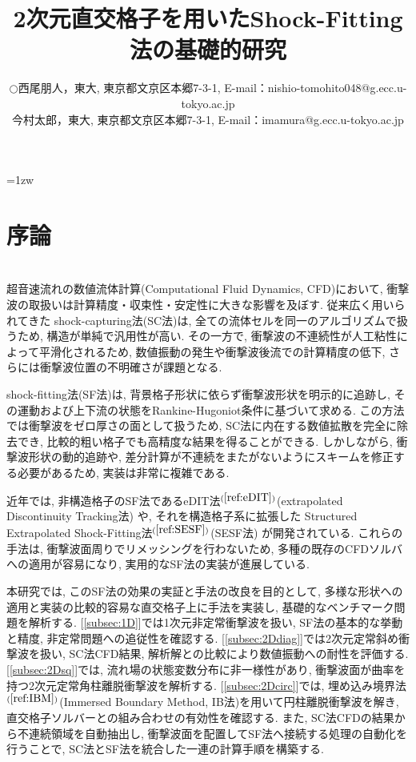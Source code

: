 \documentclass[a4j]{jarticle}
\title{2次元直交格子を用いたShock-Fitting法の基礎的研究}   %
\author{\begin{tabular}{cl}
$\bigcirc$ & 西尾朋人，東大, 
             東京都文京区本郷7-3-1, 
             E-mail：nishio-tomohito048@g.ecc.u-tokyo.ac.jp \\
           & 今村太郎，東大,
             東京都文京区本郷7-3-1, 
             E-mail：imamura@g.ecc.u-tokyo.ac.jp
\end{tabular} }
\begin{document}
\baselineskip=1zw
\maketitle

\section{序論} \label{sec:intro}
\mbox{}\\[-3.0ex]

超音速流れの数値流体計算(Computational Fluid Dynamics, CFD)において, 衝撃波の取扱いは計算精度・収束性・安定性に大きな影響を及ぼす.
従来広く用いられてきた shock-capturing法(SC法)は, 全ての流体セルを同一のアルゴリズムで扱うため, 構造が単純で汎用性が高い. 
その一方で, 衝撃波の不連続性が人工粘性によって平滑化されるため, 
数値振動の発生や衝撃波後流での計算精度の低下, さらには衝撃波位置の不明確さが課題となる.

shock-fitting法(SF法)は, 背景格子形状に依らず衝撃波形状を明示的に追跡し, 
その運動および上下流の状態をRankine-Hugoniot条件に基づいて求める.
この方法では衝撃波をゼロ厚さの面として扱うため, SC法に内在する数値拡散を完全に除去でき, 
比較的粗い格子でも高精度な結果を得ることができる. 
しかしながら, 衝撃波形状の動的追跡や, 差分計算が不連続をまたがないようにスキームを修正する必要があるため, 
実装は非常に複雑である.

近年では, 非構造格子のSF法であるeDIT法$^{(\ref{ref:eDIT})}$(extrapolated Discontinuity Tracking法) や, 
それを構造格子系に拡張した Structured Extrapolated Shock-Fitting法$^{(\ref{ref:SESF})}$(SESF法) が開発されている.
これらの手法は, 衝撃波面周りでリメッシングを行わないため,  
多種の既存のCFDソルバへの適用が容易になり, 実用的なSF法の実装が進展している.

本研究では, このSF法の効果の実証と手法の改良を目的として, 多様な形状への適用と実装の比較的容易な直交格子上に手法を実装し, 
基礎的なベンチマーク問題を解析する.
[\ref{subsec:1D}]では1次元非定常衝撃波を扱い, SF法の基本的な挙動と精度, 非定常問題への追従性を確認する.
[\ref{subsec:2Ddiag}]では2次元定常斜め衝撃波を扱い, SC法CFD結果, 解析解との比較により数値振動への耐性を評価する.
[\ref{subsec:2Dsq}]では, 流れ場の状態変数分布に非一様性があり, 衝撃波面が曲率を持つ2次元定常角柱離脱衝撃波を解析する.
[\ref{subsec:2Dcirc}]では, 埋め込み境界法$^{(\ref{ref:IBM})}$(Immersed Boundary Method, IB法)を用いて円柱離脱衝撃波を解き,
直交格子ソルバーとの組み合わせの有効性を確認する.
また, SC法CFDの結果から不連続領域を自動抽出し, 衝撃波面を配置してSF法へ接続する処理の自動化を行うことで, 
SC法とSF法を統合した一連の計算手順を構築する.
\end{document}
